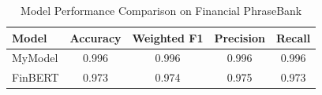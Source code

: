 
\begin{table}[h]
\centering
\caption{Model Performance Comparison on Financial PhraseBank}
\label{tab:results}
\begin{tabular}{lcccc}
\hline
\textbf{Model} & \textbf{Accuracy} & \textbf{Weighted F1} & \textbf{Precision} & \textbf{Recall} \\
\hline
MyModel & 0.996 & 0.996 & 0.996 & 0.996 \\
FinBERT & 0.973 & 0.974 & 0.975 & 0.973 \\
\hline
\end{tabular}
\end{table}
